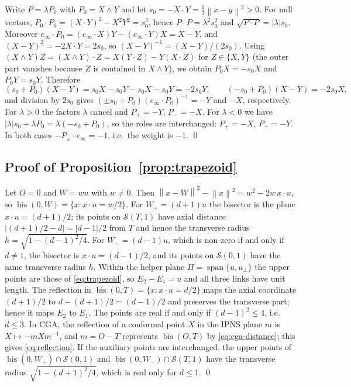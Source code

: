 \documentclass[11pt,a4paper]{article}
\theoremstyle{plain}
\theoremstyle{definition}
\theoremstyle{remark}
\newcommand{\einf}{e_{\infty}}
\newcommand{\norm}[1]{\left\lVert#1\right\rVert}
\newcommand{\abs}[1]{\left\lvert#1\right\rvert}
\newcommand{\bis}{\operatorname{bis}}
\newcommand{\Sph}{\mathcal{S}}
\begin{document}
Write $P=\lambda P_0$ with $P_0=X\wedge Y$ and let $s_0=-X\cdot Y=\frac12\norm{x-y}^2>0$.
For null vectors, $P_0\cdot P_0=(X\cdot Y)^2-X^2Y^2=s_0^2$, hence
$P\cdot P=\lambda^2s_0^2$ and $\sqrt{P\cdot P}=\abs{\lambda}s_0$. Moreover
$\einf\cdot P_0=(\einf\cdot X)Y-(\einf\cdot Y)X=X-Y$, and
$(X-Y)^2=-2X\cdot Y=2s_0$, so $(X-Y)^{-1}=(X-Y)/(2s_0)$. Using
$(X\wedge Y)Z=(X\wedge Y)\cdot Z=X(Y\cdot Z)-Y(X\cdot Z)$ for $Z\in\{X,Y\}$
(the outer part vanishes because $Z$ is contained in $X\wedge Y$), we obtain
$P_0X=-s_0X$ and $P_0Y=s_0Y$. Therefore
\begin{equation}
  (s_0+P_0)(X-Y)=s_0X-s_0Y-s_0X-s_0Y=-2s_0Y,
  \qquad
  (-s_0+P_0)(X-Y)=-2s_0X,
\end{equation}
and division by $2s_0$ gives $(\pm s_0+P_0)(\einf\cdot P_0)^{-1}=-Y$ and $-X$,
respectively. For $\lambda>0$ the factors $\lambda$ cancel and
$P_+=-Y$, $P_-=-X$. For $\lambda<0$ we have $\abs{\lambda}s_0+\lambda P_0=
\lambda(-s_0+P_0)$, so the roles are interchanged: $P_+=-X$, $P_-=-Y$. In both
cases $-P_\pm\cdot\einf=-1$, i.e.\ the weight is $-1$. \qed

\subsection{Proof of Proposition~\ref{prop:trapezoid}}\label{app:trapezoid}

Let $O=0$ and $W=wu$ with $w\neq0$. Then $\norm{x-W}^2-\norm{x}^2=w^2-2w\,x\cdot u$,
so $\bis(0,W)=\{x: x\cdot u=w/2\}$. For $W_+=(d+1)u$ the bisector is the plane
$x\cdot u=(d+1)/2$; its points on $\Sph(T,1)$ have axial distance
$\abs{(d+1)/2-d}=\abs{d-1}/2$ from $T$ and hence the transverse radius
$h=\sqrt{1-(d-1)^2/4}$. For $W_-=(d-1)u$, which is non-zero if and only if
$d\neq1$, the bisector is $x\cdot u=(d-1)/2$, and its points on $\Sph(0,1)$ have
the same transverse radius $h$. Within the helper plane $\Pi=\operatorname{span}
\{u,u_\perp\}$ the upper points are those of \cref{eq:trapezoid}, so
$E_2-E_1=u$ and all three links have unit length. The reflection in
$\bis(0,T)=\{x:x\cdot u=d/2\}$ maps the axial coordinate $(d+1)/2$ to
$d-(d+1)/2=(d-1)/2$ and preserves the transverse part; hence it maps $E_2$ to
$E_1$. The points are real if and only if $(d-1)^2\le4$, i.e.\ $d\le3$. In CGA,
the reflection of a conformal point $X$ in the IPNS plane $m$ is $X\mapsto-mXm^{-1}$,
and $m=O-T$ represents $\bis(O,T)$ by \cref{eq:cga-distance}; this gives
\cref{eq:reflection}. If the auxiliary points are interchanged, the upper points
of $\bis(0,W_+)\cap\Sph(0,1)$ and $\bis(0,W_-)\cap\Sph(T,1)$ have the transverse
radius $\sqrt{1-(d+1)^2/4}$, which is real only for $d\le1$. \qed
\end{document}
